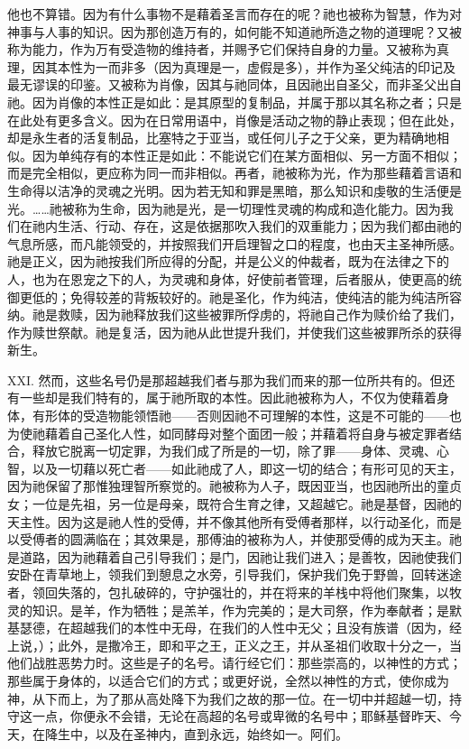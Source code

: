 他也不算错。因为有什么事物不是藉着圣言而存在的呢？祂也被称为智慧，作为对神事与人事的知识。因为那创造万有的，如何能不知道祂所造之物的道理呢？又被称为能力，作为万有受造物的维持者，并赐予它们保持自身的力量。又被称为真理，因其本性为一而非多（因为真理是一，虚假是多），并作为圣父纯洁的印记及最无谬误的印鉴。又被称为肖像，因其与祂同体，且因祂出自圣父，而非圣父出自祂。因为肖像的本性正是如此：是其原型的复制品，并属于那以其名称之者；只是在此处有更多含义。因为在日常用语中，肖像是活动之物的静止表现；但在此处，却是永生者的活复制品，比塞特之于亚当，或任何儿子之于父亲，更为精确地相似。因为单纯存有的本性正是如此：不能说它们在某方面相似、另一方面不相似；而是完全相似，更应称为同一而非相似。再者，祂被称为光，作为那些藉着言语和生命得以洁净的灵魂之光明。因为若无知和罪是黑暗，那么知识和虔敬的生活便是光。……祂被称为生命，因为祂是光，是一切理性灵魂的构成和造化能力。因为我们在祂内生活、行动、存在，这是依据那吹入我们的双重能力；因为我们都由祂的气息所感，而凡能领受的，并按照我们开启理智之口的程度，也由天主圣神所感。祂是正义，因为祂按我们所应得的分配，并是公义的仲裁者，既为在法律之下的人，也为在恩宠之下的人，为灵魂和身体，好使前者管理，后者服从，使更高的统御更低的；免得较差的背叛较好的。祂是圣化，作为纯洁，使纯洁的能为纯洁所容纳。祂是救赎，因为祂释放我们这些被罪所俘虏的，将祂自己作为赎价给了我们，作为赎世祭献。祂是复活，因为祂从此世提升我们，并使我们这些被罪所杀的获得新生。\par

XXI. 然而，这些名号仍是那超越我们者与那为我们而来的那一位所共有的。但还有一些却是我们特有的，属于祂所取的本性。因此祂被称为人，不仅为使藉着身体，有形体的受造物能领悟祂——否则因祂不可理解的本性，这是不可能的——也为使祂藉着自己圣化人性，如同酵母对整个面团一般；并藉着将自身与被定罪者结合，释放它脱离一切定罪，为我们成了所是的一切，除了罪——身体、灵魂、心智，以及一切藉以死亡者——如此祂成了人，即这一切的结合；有形可见的天主，因为祂保留了那惟独理智所察觉的。祂被称为人子，既因亚当，也因祂所出的童贞女；一位是先祖，另一位是母亲，既符合生育之律，又超越它。祂是基督，因祂的天主性。因为这是祂人性的受傅，并不像其他所有受傅者那样，以行动圣化，而是以受傅者的圆满临在；其效果是，那傅油的被称为人，并使那受傅的成为天主。祂是道路，因为祂藉着自己引导我们；是门，因祂让我们进入；是善牧，因祂使我们安卧在青草地上，领我们到憩息之水旁，引导我们，保护我们免于野兽，回转迷途者，领回失落的，包扎破碎的，守护强壮的，并在将来的羊栈中将他们聚集，以牧灵的知识。是羊，作为牺牲；是羔羊，作为完美的；是大司祭，作为奉献者；是默基瑟德，在超越我们的本性中无母，在我们的人性中无父；且没有族谱（因为，经上说，）；此外，是撒冷王，即和平之王，正义之王，并从圣祖们收取十分之一，当他们战胜恶势力时。这些是子的名号。请行经它们：那些崇高的，以神性的方式；那些属于身体的，以适合它们的方式；或更好说，全然以神性的方式，使你成为神，从下而上，为了那从高处降下为我们之故的那一位。在一切中并超越一切，持守这一点，你便永不会错，无论在高超的名号或卑微的名号中；耶稣基督昨天、今天，在降生中，以及在圣神内，直到永远，始终如一。阿们。\par


